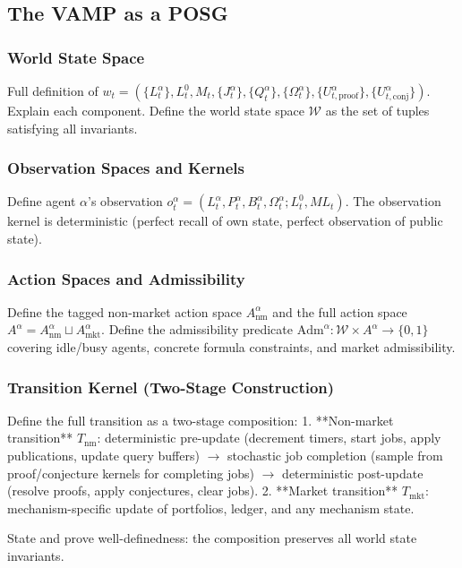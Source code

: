 \subsection{The VAMP as a POSG}

\subsubsection{World State Space}
Full definition of $w_t = (\{L^\alpha_t\}, L^0_t, M_t, \{J^\alpha_t\}, \{Q^\alpha_t\}, \{\Omega^\alpha_t\}, \{U^\alpha_{t,\text{proof}}\}, \{U^\alpha_{t,\text{conj}}\})$. Explain each component. Define the world state space $\mathcal{W}$ as the set of tuples satisfying all invariants.

\subsubsection{Observation Spaces and Kernels}
Define agent $\alpha$'s observation $o^\alpha_t = (L^\alpha_t, P^\alpha_t, B^\alpha_t, \Omega^\alpha_t; L^0_t, ML_t)$. The observation kernel is deterministic (perfect recall of own state, perfect observation of public state).

\subsubsection{Action Spaces and Admissibility}
Define the tagged non-market action space $A^\alpha_{\text{nm}}$ and the full action space $A^\alpha = A^\alpha_{\text{nm}} \sqcup A^\alpha_{\text{mkt}}$. Define the admissibility predicate $\text{Adm}^\alpha : \mathcal{W} \times A^\alpha \to \{0,1\}$ covering idle/busy agents, concrete formula constraints, and market admissibility.

\subsubsection{Transition Kernel (Two-Stage Construction)}
Define the full transition as a two-stage composition:
1. **Non-market transition** $T_{\text{nm}}$: deterministic pre-update (decrement timers, start jobs, apply publications, update query buffers) $\to$ stochastic job completion (sample from proof/conjecture kernels for completing jobs) $\to$ deterministic post-update (resolve proofs, apply conjectures, clear jobs).
2. **Market transition** $T_{\text{mkt}}$: mechanism-specific update of portfolios, ledger, and any mechanism state.

State and prove well-definedness: the composition preserves all world state invariants.

